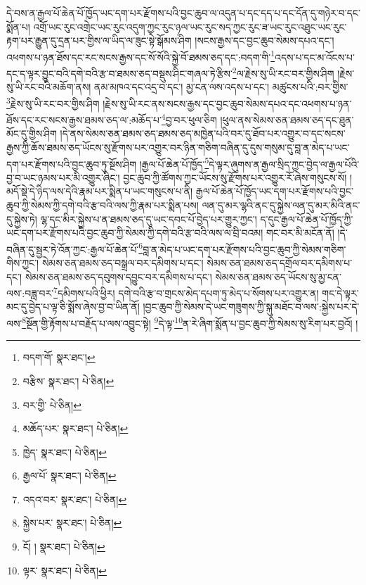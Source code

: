 དེ་བས་ན་རྒྱལ་པོ་ཆེན་པོ་ཁྱོད་ཡང་དག་པར་རྫོགས་པའི་བྱང་ཆུབ་ལ་འདུན་པ་དང་དད་པ་དང་དོན་དུ་གཉེར་བ་དང་སྨོན་པ། འགྲོ་ཡང་རུང་འགྲེང་ཡང་རུང་འདུག་ཀྱང་རུང་ཉལ་ཡང་རུང་སད་ཀྱང་རུང་ཟ་ཡང་རུང་འཐུང་ཡང་རུང་རྟག་པར་རྒྱུན་དུ་དྲན་པར་གྱིས་ལ་ཡིད་ལ་ཟུང་སྟེ་སྒོམས་ཤིག །སངས་རྒྱས་དང་བྱང་ཆུབ་སེམས་དཔའ་དང་། འཕགས་པ་ཉན་ཐོས་དང་རང་སངས་རྒྱས་དང་སོ་སོའི་སྐྱེ་བོ་ཐམས་ཅད་དང་:བདག་གི་\footnote{བདག་གོ་  སྣར་ཐང་། }འདས་པ་དང་མ་འོངས་པ་དང་ད་ལྟར་བྱུང་བའི་དགེ་བའི་རྩ་བ་ཐམས་ཅད་བསྡུས་ཤིང་གཞལ་ཏེ་རྩིས་\footnote{བརྩིས་  སྣར་ཐང་།  པེ་ཅིན། }ལ་རྗེས་སུ་ཡི་རང་བར་གྱིས་ཤིག །རྗེས་སུ་ཡི་རང་བའི་མཆོག་ནས། ནམ་མཁའ་དང་འདྲ་བ་དང་། མྱ་ངན་ལས་འདས་པ་དང་། མཚུངས་པའི་:བར་གྱིས་\footnote{བར་གྱི་  པེ་ཅིན། }རྗེས་སུ་ཡི་རང་བར་གྱིས་ཤིག །རྗེས་སུ་ཡི་རང་ནས་སངས་རྒྱས་དང་བྱང་ཆུབ་སེམས་དཔའ་དང་འཕགས་པ་ཉན་ཐོས་དང་རང་སངས་རྒྱས་ཐམས་ཅད་ལ་:མཆོད་པ་\footnote{མཆོད་པར་  སྣར་ཐང་།  པེ་ཅིན། }བྱ་བར་ཕུལ་ཅིག །ཕུལ་ནས་སེམས་ཅན་ཐམས་ཅད་དང་ཐུན་མོང་དུ་གྱིས་ཤིག །དེ་ནས་སེམས་ཅན་ཐམས་ཅད་ཐམས་ཅད་མཁྱེན་པའི་བར་དུ་ཐོབ་པར་འགྱུར་བ་དང་སངས་རྒྱས་ཀྱི་ཆོས་ཐམས་ཅད་ཡོངས་སུ་རྫོགས་པར་འགྱུར་བར་ཉིན་གཅིག་བཞིན་དུ་དུས་གསུམ་དུ་བླ་ན་མེད་པ་ཡང་དག་པར་རྫོགས་པའི་བྱང་ཆུབ་ཏུ་སྔོས་ཤིག །རྒྱལ་པོ་ཆེན་པོ་ཁྱོད་\footnote{ཁྱེད་  སྣར་ཐང་།  པེ་ཅིན། }དེ་ལྟར་ཞུགས་ན་རྒྱལ་སྲིད་ཀྱང་བྱེད་ལ་རྒྱལ་པོའི་བྱ་བ་ཡང་ཉམས་པར་མི་འགྱུར་ཞིང་། བྱང་ཆུབ་ཀྱི་ཚོགས་ཀྱང་ཡོངས་སུ་རྫོགས་པར་འགྱུར་རོ་ཞེས་གསུངས་སོ། །མདོ་སྡེ་དེ་ཉིད་ལས་དེའི་རྣམ་པར་སྨིན་པ་ཡང་གསུངས་པ་ནི། རྒྱལ་པོ་ཆེན་པོ་ཁྱོད་ཡང་དག་པར་རྫོགས་པའི་བྱང་ཆུབ་ཀྱི་སེམས་ཀྱི་དགེ་བའི་རྩ་བའི་ལས་ཀྱི་རྣམ་པར་སྨིན་པས། ལན་དུ་མར་ལྷའི་ནང་དུ་སྐྱེས་ལན་དུ་མར་མིའི་ནང་དུ་སྐྱེས་ཏེ། ལྷ་དང་མིར་སྐྱེས་པ་ན་ཐམས་ཅད་དུ་ཡང་དབང་པོ་བྱེད་པར་གྱུར་ཀྱང་། ད་དུང་རྒྱལ་པོ་ཆེན་པོ་ཁྱོད་ཀྱི་ཡང་དག་པར་རྫོགས་པའི་བྱང་ཆུབ་ཀྱི་སེམས་ཀྱི་དགེ་བའི་རྩ་བའི་ལས་ལ་བྲི་བའམ། གང་བར་མི་མངོན་ནོ། །དེ་བཞིན་དུ་སྦྱར་ཏེ་འོན་ཀྱང་:རྒྱལ་པོ་ཆེན་པོ་\footnote{རྒྱལ་པོ་  སྣར་ཐང་།  པེ་ཅིན། }བླ་ན་མེད་པ་ཡང་དག་པར་རྫོགས་པའི་བྱང་ཆུབ་ཀྱི་སེམས་གཅིག་གིས་ཀྱང་། སེམས་ཅན་ཐམས་ཅད་བསྒྲལ་བར་དམིགས་པ་དང་། སེམས་ཅན་ཐམས་ཅད་དགྲོལ་བར་དམིགས་པ་དང་། སེམས་ཅན་ཐམས་ཅད་དབུགས་དབྱུང་བར་དམིགས་པ་དང་། སེམས་ཅན་ཐམས་ཅད་ཡོངས་སུ་མྱ་ངན་ལས་:བཟླ་བར་\footnote{འདའ་བར་  སྣར་ཐང་།  པེ་ཅིན། }དམིགས་པའི་ཕྱིར། དགེ་བའི་རྩ་བ་གྲངས་མེད་དཔག་ཏུ་མེད་པ་སོགས་པར་འགྱུར་ན། གང་དེ་ལྟར་མང་དུ་བྱེད་པ་ལྟ་ཅི་སྨོས་ཞེས་བྱ་བ་ཡིན་ནོ། །བྱང་ཆུབ་ཀྱི་སེམས་དེ་ཡང་གཟུགས་ཀྱི་སྐུ་མཐོང་བ་ལས་:སྐྱེས་པར་དེ་ལས་\footnote{སྐྱེས་པར་  སྣར་ཐང་།  པེ་ཅིན། }སྔོན་གྱི་རྟོགས་པ་བརྗོད་པ་ལས་འབྱུང་སྟེ། \footnote{ངོ། །   སྣར་ཐང་།  པེ་ཅིན། }དེ་ལྟ་\footnote{ལྟར་  སྣར་ཐང་།  པེ་ཅིན། }ན་རེ་ཞིག་སྨོན་པ་བྱང་ཆུབ་ཀྱི་སེམས་སུ་རིག་པར་བྱའོ། །
